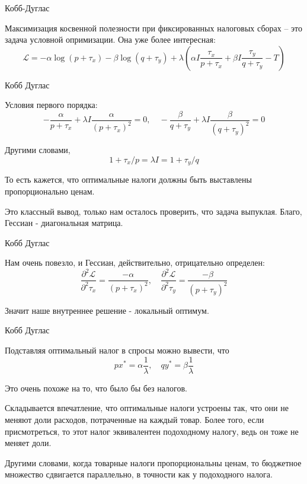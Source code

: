 \documentclass{beamer}
\begin{document}
\begin{frame}{Кобб-Дуглас}

Максимизация косвенной полезности при фиксированных налоговых сборах – это задача условной опримизации. Она уже более интересная:
$$\mathcal{L} = - \alpha \log(p + \tau_x) - \beta \log (q + \tau_y) + \lambda (\alpha I \frac{\tau_x}{p+\tau_x} + \beta I \frac{\tau_y}{q+\tau_y} - T)$$

\end{frame}

\begin{frame}{Кобб Дуглас}

Условия первого порядка:
$$ - \frac{\alpha}{p + \tau_x} + \lambda I \frac{\alpha}{(p + \tau_x)^2} = 0, \quad - \frac{\beta}{q + \tau_y} + \lambda I \frac{\beta}{(q + \tau_y)^2} = 0$$

Другими словами,
$$1 + \tau_x / p = \lambda I = 1 + \tau_y / q$$

То есть кажется, что оптимальные налоги должны быть выставлены пропорционально ценам. 

Это классный вывод, только нам осталось проверить, что задача выпуклая. Благо, Гессиан - диагональная матрица.

\end{frame}

\begin{frame}{Кобб Дуглас}

Нам очень повезло, и Гессиан, действительно, отрицательно определен:
$$ \frac{\partial^2 \mathcal{L}}{\partial^2 \tau_x} = \frac{-\alpha}{(p+\tau_x)^2}, \quad \frac{\partial^2 \mathcal{L}}{\partial^2 \tau_y} = \frac{-\beta}{(p+\tau_y)^2}$$

Значит наше внутреннее решение - локальный оптимум.

\end{frame}

\begin{frame}{Кобб Дуглас}

Подставляя оптимальный налог в спросы можно вывести, что
$$ p x^{\ast} = \alpha \frac{1}{\lambda}, \quad q y^{\ast} = \beta \frac{1}{\lambda}$$

Это очень похоже на то, что было бы без налогов. 

Складывается впечатление, что оптимальные налоги устроены так, что они не меняют доли расходов, потраченные на каждый товар. Более того, если присмотреться, то этот налог эквивалентен подоходному налогу, ведь он тоже не меняет доли. 

Другими словами, когда товарные налоги пропорциональны ценам, то бюджетное множество сдвигается параллельно, в точности как у подоходного налога.

\end{frame}
\end{document}
